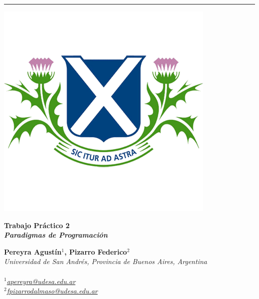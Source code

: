 \documentclass[11pt, a4paper]{article}
\begin{document}
\vspace*{1.5cm} 

{\noindent\rule{\textwidth}{0.5pt}}
\noindent
\begin{minipage}{0.24\textwidth}
    \includegraphics[width=\linewidth]{figures/logo2.png}
\end{minipage}
\hspace{0.02\textwidth}
\begin{minipage}{0.7\textwidth}
    {\fontsize{32}{36}\selectfont\bfseries\color{udesaBlue}\selectfont Trabajo Práctico 2}\\
    {\fontsize{20}{24}\selectfont\bfseries\itshape\color{udesaGreen}\selectfont Paradigmas de Programación}
\end{minipage}

\begin{minipage}{0.8\textwidth}
    {\large\textbf{\color{udesaBlue} Pereyra Agustín$^{1}$, \color{udesaBlue}Pizarro Federico$^{2}$}}\\
    {\itshape\small
    Universidad de San Andrés, Provincia de Buenos Aires, Argentina\\
    {}\\
    \scriptsize {$^1$\href{mailto:apereyra@udesa.edu.ar}{apereyra@udesa.edu.ar}\\
    $^2$\href{mailto:fpizarrodalmaso@udesa.edu.ar}{fpizarrodalmaso@udesa.edu.ar}}
}
\end{minipage}
\vspace{0.5cm}
\end{document}
